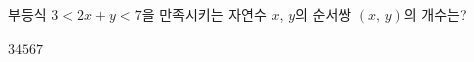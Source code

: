 부등식 $3<2x+y<7$을 만족시키는 자연수 $x$, $y$의 순서쌍 $(x,\,y)$의 개수는?
\begin{choices32}{$3$}{$4$}{$5$}{$6$}{$7$}\end{choices32}
